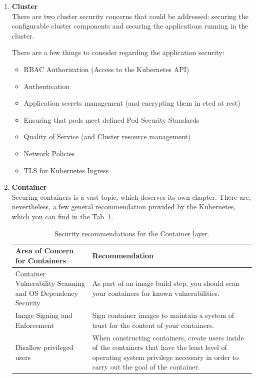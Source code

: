 \begin{enumerate}
\item \textbf{Cluster} \\
There are two cluster security concerns that could be addressed: securing the configurable cluster components and securing the applications running in the cluster.

There are a few things to consider regarding the application security:
\begin{itemize}
\item RBAC Authorization (Access to the Kubernetes API)
\item Authentication	
\item Application secrets management (and encrypting them in etcd at rest)
\item Ensuring that pods meet defined Pod Security Standards
\item Quality of Service (and Cluster resource management)
\item Network Policies
\item TLS for Kubernetes Ingress
\end{itemize}

\item \textbf{Container} \\
Securing containers is a vast topic, which deserves its own chapter. There are, nevertheless, a few general recommendation provided by the Kubernetes, which you can find in the Tab~\ref{tab:container-security-recommendations}.

\begin{table}[H]
    \begin{center}
        \begin{tabular}{ | >{\raggedright\arraybackslash}p{} 
                         | >{\raggedright\arraybackslash}p{} | } 
        \hline
        \textbf{Area of Concern for Containers} & \textbf{Recommendation} \\ 
        \hline
        Container Vulnerability Scanning and OS Dependency Security & As part of an image build step, you should scan your containers for known vulnerabilities. \\ 
        \hline
        Image Signing and Enforcement & Sign container images to maintain a system of trust for the content of your containers. \\ 
        \hline
        Disallow privileged users & When constructing containers, create users inside of the containers that have the least level of operating system privilege necessary in order to carry out the goal of the container. \\
        \hline
        \end{tabular}
    \end{center}
    \caption{Security recommendations for the Container layer.}
    \label{tab:container-security-recommendations}
\end{table}


\end{enumerate}
